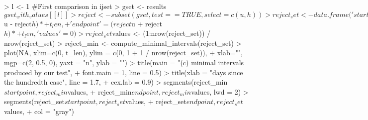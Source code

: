 \documentclass[a4paper]{scrartcl}
\begin{document}
\begin{Schunk}
\begin{Sinput}
> l <- 1 #First comparison in ijset
> gset       <- results$gset_with_values[[l]]
> reject     <- subset(gset, test == TRUE, select = c(u, h))
> reject_set <- data.frame('startpoint' = (reject$u - reject$h) *
+                            t_len,
+                          'endpoint' = (reject$u + reject$h) *
+                            t_len, 'values' = 0)
> reject_set$values <- (1:nrow(reject_set)) / nrow(reject_set)
> reject_min        <- compute_minimal_intervals(reject_set)
> plot(NA, xlim=c(0, t_len),  ylim = c(0, 1 + 1 / nrow(reject_set)),
+      xlab="", mgp=c(2, 0.5, 0), yaxt = "n", ylab = "")
> title(main = "(c) minimal intervals produced by our test",
+       font.main = 1, line = 0.5)
> title(xlab = "days since the hundredth case", line = 1.7,
+       cex.lab = 0.9)
> segments(reject_min$startpoint, reject_min$values,
+          reject_min$endpoint, reject_min$values, lwd = 2)
> segments(reject_set$startpoint, reject_set$values,
+          reject_set$endpoint, reject_set$values,
+          col = "gray")
\end{Sinput}
\end{Schunk}


% 
\end{document}
